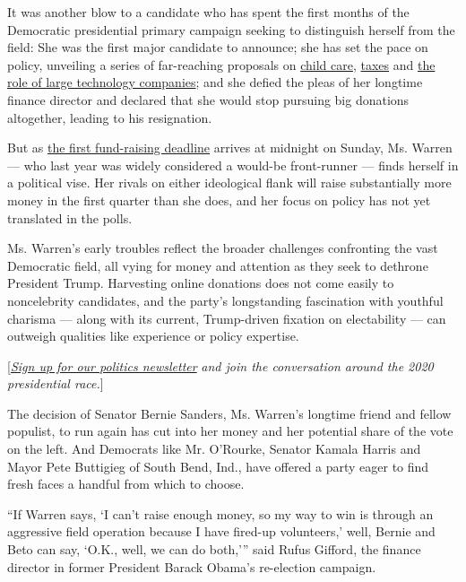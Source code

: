 It was another blow to a candidate who has spent the first months of the
Democratic presidential primary campaign seeking to distinguish herself
from the field: She was the first major candidate to announce; she has
set the pace on policy, unveiling a series of far-reaching proposals on
\href{https://www.nytimes3xbfgragh.onion/2019/02/19/us/politics/elizabeth-warren-child-care.html}{child
care},
\href{https://www.nytimes3xbfgragh.onion/2019/01/24/us/politics/wealth-tax-democrats.html}{taxes}
and
\href{https://www.nytimes3xbfgragh.onion/2019/03/08/us/politics/elizabeth-warren-amazon.html}{the
role of large technology companies}; and she defied the pleas of her
longtime finance director and declared that she would stop pursuing big
donations altogether, leading to his resignation.

But as
\href{https://www.nytimes3xbfgragh.onion/2019/03/30/us/politics/democrats-2020-donors.html}{the
first fund-raising deadline} arrives at midnight on Sunday, Ms. Warren
--- who last year was widely considered a would-be front-runner ---
finds herself in a political vise. Her rivals on either ideological
flank will raise substantially more money in the first quarter than she
does, and her focus on policy has not yet translated in the polls.

Ms. Warren's early troubles reflect the broader challenges confronting
the vast Democratic field, all vying for money and attention as they
seek to dethrone President Trump. Harvesting online donations does not
come easily to noncelebrity candidates, and the party's longstanding
fascination with youthful charisma --- along with its current,
Trump-driven fixation on electability --- can outweigh qualities like
experience or policy expertise.

{[}\emph{\href{https://www.nytimes3xbfgragh.onion/newsletters/politics?smid=rd\%3Faction\%3Dclick\&module=inline\&pgtype=Article}{Sign
up for our politics newsletter}} \emph{and join the conversation around
the 2020 presidential race.}{]}

The decision of Senator Bernie Sanders, Ms. Warren's longtime friend and
fellow populist, to run again has cut into her money and her potential
share of the vote on the left. And Democrats like Mr. O'Rourke, Senator
Kamala Harris and Mayor Pete Buttigieg of South Bend, Ind., have offered
a party eager to find fresh faces a handful from which to choose.

``If Warren says, `I can't raise enough money, so my way to win is
through an aggressive field operation because I have fired-up
volunteers,' well, Bernie and Beto can say, `O.K., well, we can do
both,''' said Rufus Gifford, the finance director in former President
Barack Obama's re-election campaign.

